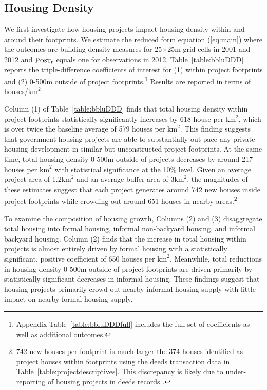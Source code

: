 \documentclass[12pt]{article}
\begin{document}
\subsection{Housing Density}\label{section:bbluestimates}

We first investigate how housing projects impact housing density within and around their footprints.  We estimate the reduced form equation (\ref{eq:main}) where the outcomes are building density measures for 25$\times$25m grid cells in 2001 and 2012 and $\textsc{\small Post}_{t}$ equals one for observations in 2012.  Table~\ref{table:bbluDDD} reports the triple-difference coefficients of interest for (1) within project footprints and (2) 0-500m outside of project footprints.\footnote{Appendix Table~\ref{table:bbluDDDfull} includes the full set of coefficients as well as additional outcomes.}  Results are reported in terms of houses/$\text{km}^{2}$.  

Column (1) of Table~\ref{table:bbluDDD} finds that total housing density within project footprints statistically significantly increases by 618 house per $\text{km}^{2}$, which is over twice the baseline average of 579 houses per $\text{km}^{2}$.  This finding suggests that government housing projects are able to substantially out-pace any private housing development in similar but unconstructed project footprints.  At the same time, total housing density 0-500m outside of projects decreases by around 217 houses per $\text{km}^{2}$ with statistical significance at the 10\% level.  Given an average project area of 1.2$\text{km}^{2}$ and an average buffer area of 3$\text{km}^{2}$, the magnitudes of these estimates suggest that each project generates around 742 new houses inside project footprints while crowding out around 651 houses in nearby areas.\footnote{742 new houses per footprint is much larger the 374 houses identified as project houses within footprints using the deeds transaction data in Table~\ref{table:projectdescriptives}.  This discrepancy is likely due to under-reporting of housing projects in deeds records \citep{seriq}.}  


To examine the composition of housing growth, Columns (2) and (3) disaggregate total housing into formal housing, informal non-backyard housing, and informal backyard housing.  Column (2) finds that the increase in total housing within projects is almost entirely driven by formal housing with a statistically significant, positive coefficient of 650 houses per $\text{km}^{2}$.  Meanwhile, total reductions in housing density 0-500m outside of project footprints are driven primarily by statistically significant decreases in informal housing.  These findings suggest that housing projects primarily crowd-out nearby informal housing supply with little impact on nearby formal housing supply.
\end{document}
